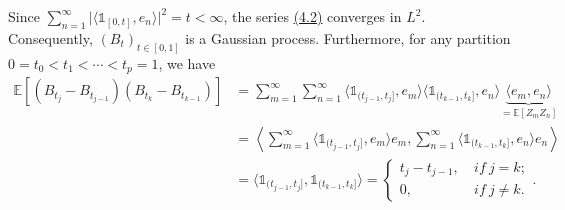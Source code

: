 \documentclass{article}
\numberwithin{equation}{section}
\newcommand{\E}{\mathbb{E}}
\theoremstyle{plain}
\theoremstyle{definition}
\begin{document}
Since $\sum_{n=1}^\infty\vert \langle\mathds{1}_{[0,t]},e_n\rangle\vert^2=t<\infty$, the series \hyperref[eq:4.2]{(4.2)} converges in $L^2$. Consequently, $(B_t)_{t\in[0,1]}$ is a Gaussian process.  Furthermore, for any partition $0=t_0<t_1<\cdots<t_p=1$, we have
\begin{align*}
	\E\left[(B_{t_j}-B_{t_{j-1}})(B_{t_k}-B_{t_{k-1}})\right]&=\sum_{m=1}^\infty\sum_{n=1}^\infty\langle\mathds{1}_{(t_{j-1},t_j]},e_m\rangle\langle\mathds{1}_{(t_{k-1},t_k]},e_n\rangle\underbrace{\langle e_m,e_n\rangle}_{=\E[Z_mZ_n]}\\
	&=\left\langle\sum_{m=1}^\infty\langle\mathds{1}_{(t_{j-1},t_j]},e_m\rangle e_m,\sum_{n=1}^\infty\langle\mathds{1}_{(t_{k-1},t_k]},e_n\rangle e_n\right\rangle\\
	&= \langle\mathds{1}_{(t_{j-1},t_j]},\mathds{1}_{(t_{k-1},t_k]}\rangle=\begin{cases}
		t_j-t_{j-1},\ &\textit{if}\ j=k;\\
		0,\ &\textit{if}\ j\neq k.
	\end{cases}.
\end{align*}
\end{document}
